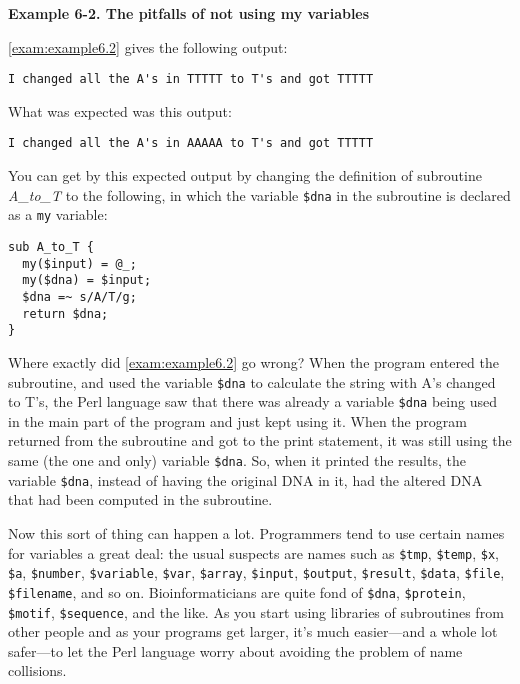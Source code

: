 \textbf{Example 6-2. The pitfalls of not using my variables}


\autoref{exam:example6.2} gives the following output:

\begin{lstlisting}
I changed all the A's in TTTTT to T's and got TTTTT 
\end{lstlisting}

What was expected was this output:

\begin{lstlisting}
I changed all the A's in AAAAA to T's and got TTTTT 
\end{lstlisting}

You can get by this expected output by changing the definition of subroutine \textit{A\_to\_T} to the following, in which the variable \verb|$dna| in the subroutine is declared as a \verb|my| variable: 

\begin{lstlisting}
sub A_to_T {
  my($input) = @_;
  my($dna) = $input;
  $dna =~ s/A/T/g;
  return $dna;
}
\end{lstlisting}

Where exactly did \autoref{exam:example6.2} go wrong? When the program entered the subroutine, and used the variable \verb|$dna| to calculate the string with A's changed to T's, the Perl language saw that there was already a variable \verb|$dna| being used in the main part of the program and just kept using it.  When the program returned from the subroutine and got to the print statement, it was still using the same (the one and only) variable \verb|$dna|.  So, when it printed the results, the variable \verb|$dna|, instead of having the original DNA in it, had the altered DNA that had been computed in the subroutine.

Now this sort of thing can happen a lot. Programmers tend to use certain names for variables a great deal: the usual suspects are names such as \verb|$tmp|, \verb|$temp|, \verb|$x|, \verb|$a|, \verb|$number|, \verb|$variable|, \verb|$var|, \verb|$array|, \verb|$input|, \verb|$output|, \verb|$result|, \verb|$data|, \verb|$file|, \verb|$filename|, and so on. Bioinformaticians are quite fond of \verb|$dna|, \verb|$protein|, \verb|$motif|, \verb|$sequence|, and the like. As you start using libraries of subroutines from other people and as your programs get larger, it's much easier—and a whole lot safer—to let the Perl language worry about avoiding the problem of name collisions.

